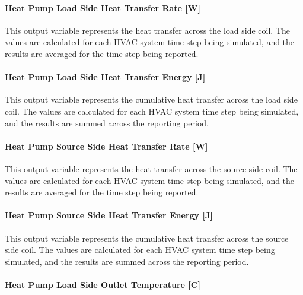 \paragraph{Heat Pump Load Side Heat Transfer Rate {[}W{]}}\label{water-to-water-heat-pump-load-side-heat-transfer-rate-w-1}

This output variable represents the heat transfer across the load side coil. The values are calculated for each HVAC system time step being simulated, and the results are averaged for the time step being reported.

\paragraph{Heat Pump Load Side Heat Transfer Energy {[}J{]}}\label{water-to-water-heat-pump-load-side-heat-transfer-energy-j-1}

This output variable represents the cumulative heat transfer across the load side coil. The values are calculated for each HVAC system time step being simulated, and the results are summed across the reporting period.

\paragraph{Heat Pump Source Side Heat Transfer Rate {[}W{]}}\label{water-to-water-heat-pump-source-side-heat-transfer-rate-w-1}

This output variable represents the heat transfer across the source side coil. The values are calculated for each HVAC system time step being simulated, and the results are averaged for the time step being reported.

\paragraph{Heat Pump Source Side Heat Transfer Energy {[}J{]}}\label{water-to-water-heat-pump-source-side-heat-transfer-energy-j-1}

This output variable represents the cumulative heat transfer across the source side coil. The values are calculated for each HVAC system time step being simulated, and the results are summed across the reporting period.

\paragraph{Heat Pump Load Side Outlet Temperature {[}C{]}}\label{water-to-water-heat-pump-load-side-outlet-temperature-c-1}

